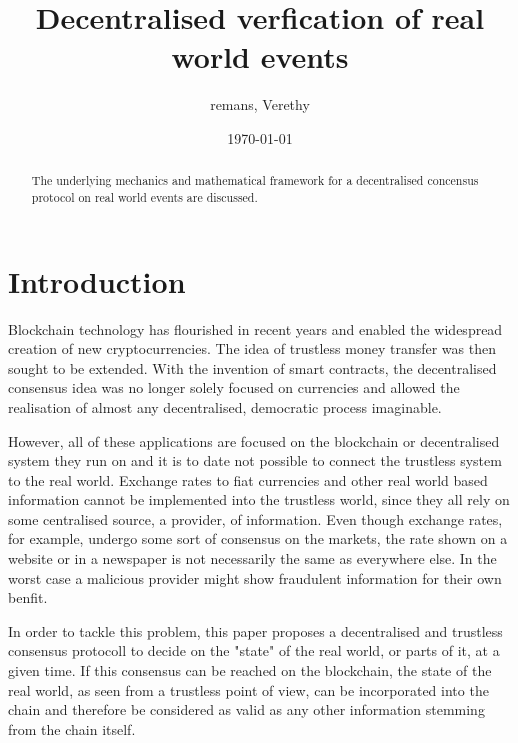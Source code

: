 \documentclass{article}
\title{Decentralised verfication of real world events}
\date{\today}
\author{remans, Verethy}
\begin{document}
	\maketitle
	
	\begin{abstract}
		The underlying mechanics and mathematical framework for a decentralised concensus protocol on real world events are discussed.
	\end{abstract}
	
	\section{Introduction}
		Blockchain technology has flourished in recent years and enabled the widespread creation of new cryptocurrencies. The idea of trustless money transfer was then sought to be extended. With the invention of smart contracts, the decentralised consensus idea was no longer solely focused on currencies and allowed the realisation of almost any decentralised, democratic process imaginable. 
		
		However, all of these applications are focused on the blockchain or decentralised system they run on and it is to date not possible to connect the trustless system to the real world. Exchange rates to fiat currencies and other real world based information cannot be implemented into the trustless world, since they all rely on some centralised source, a provider, of information. Even though exchange rates, for example, undergo some sort of consensus on the markets, the rate shown on a website or in a newspaper is not necessarily the same as everywhere else. In the worst case a malicious provider might show fraudulent information for their own benfit.
		
		In order to tackle this problem, this paper proposes a decentralised and trustless consensus protocoll to decide on the "state" of the real world, or parts of it, at a given time. If this consensus can be reached on the blockchain, the state of the real world, as seen from a trustless point of view, can be incorporated into the chain and therefore be considered as valid as any other information stemming from the chain itself.
		
\end{document}
